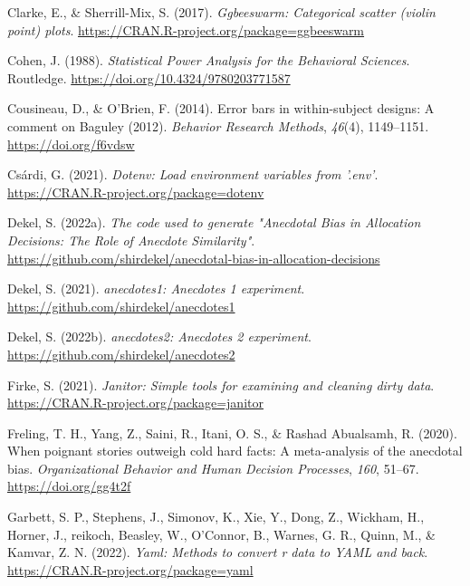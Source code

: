 \documentclass[
  man, donotrepeattitle,floatsintext]{apa7}
\newlength{\cslhangindent}
\newlength{\cslentryspacingunit} %
\newenvironment{CSLReferences}[2] %
 {%
  \setlength{\parindent}{0pt}
  \ifodd #1
  \let\oldpar\par
  \def\par{\hangindent=\cslhangindent\oldpar}
  \fi
  \setlength{\parskip}{#2\cslentryspacingunit}
 }%
 {}
\theoremstyle{definition}
\theoremstyle{definition}
\theoremstyle{definition}
\theoremstyle{definition}
\theoremstyle{remark}
\begin{document}
\begin{CSLReferences}{1}{0}
\leavevmode{}%
Clarke, E., \& Sherrill-Mix, S. (2017). \emph{Ggbeeswarm: Categorical scatter (violin point) plots}. \url{https://CRAN.R-project.org/package=ggbeeswarm}

\leavevmode{}%
Cohen, J. (1988). \emph{Statistical {Power Analysis} for the {Behavioral Sciences}}. {Routledge}. \url{https://doi.org/10.4324/9780203771587}

\leavevmode{}%
Cousineau, D., \& O'Brien, F. (2014). Error bars in within-subject designs: A comment on {Baguley} (2012). \emph{Behavior Research Methods}, \emph{46}(4), 1149--1151. \url{https://doi.org/f6vdsw}

\leavevmode{}%
Csárdi, G. (2021). \emph{Dotenv: Load environment variables from '.env'}. \url{https://CRAN.R-project.org/package=dotenv}

\leavevmode{}%
Dekel, S. (2022a). \emph{The code used to generate "{Anecdotal Bias} in {Allocation Decisions}: {The Role} of {Anecdote Similarity}"}. \url{https://github.com/shirdekel/anecdotal-bias-in-allocation-decisions}

\leavevmode{}%
Dekel, S. (2021). \emph{anecdotes1: Anecdotes 1 experiment}. \url{https://github.com/shirdekel/anecdotes1}

\leavevmode{}%
Dekel, S. (2022b). \emph{anecdotes2: Anecdotes 2 experiment}. \url{https://github.com/shirdekel/anecdotes2}

\leavevmode{}%
Firke, S. (2021). \emph{Janitor: Simple tools for examining and cleaning dirty data}. \url{https://CRAN.R-project.org/package=janitor}

\leavevmode{}%
Freling, T. H., Yang, Z., Saini, R., Itani, O. S., \& Rashad Abualsamh, R. (2020). When poignant stories outweigh cold hard facts: {A} meta-analysis of the anecdotal bias. \emph{Organizational Behavior and Human Decision Processes}, \emph{160}, 51--67. \url{https://doi.org/gg4t2f}

\leavevmode{}%
Garbett, S. P., Stephens, J., Simonov, K., Xie, Y., Dong, Z., Wickham, H., Horner, J., reikoch, Beasley, W., O'Connor, B., Warnes, G. R., Quinn, M., \& Kamvar, Z. N. (2022). \emph{Yaml: Methods to convert r data to YAML and back}. \url{https://CRAN.R-project.org/package=yaml}


\end{CSLReferences}
\end{document}
